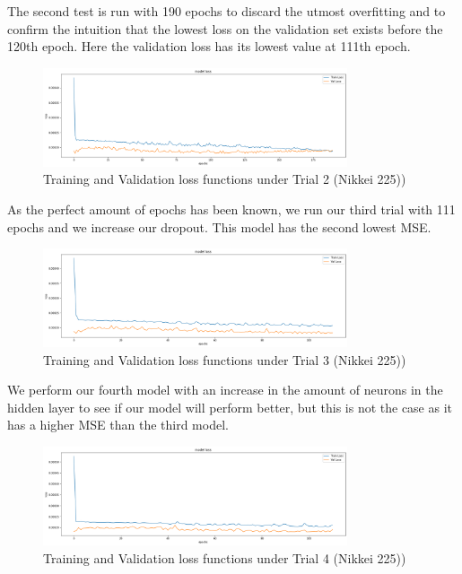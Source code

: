 \documentclass[a4paper,11pt,oneside]{book}
\begin{document}
 The second test is run with 190 epochs to discard the utmost overfitting and to confirm the intuition that the lowest loss on the validation set exists
 before the 120th epoch. Here the validation loss has its lowest value at 111th epoch. 
\begin{figure}[!h]
	\centering
	\includegraphics[width=0.8\textwidth]{figures/Nik2}
	\caption{Training and Validation loss functions under Trial 2 (Nikkei 225))}
	\label{Nik2}
\end{figure}

As the perfect amount of epochs has been known, we run our third trial with 111 epochs and we increase our dropout. This model has the second lowest MSE. 
\newpage
\begin{figure}[!h]
	\centering
	\includegraphics[width=0.8\textwidth]{figures/Nik3}
	\caption{Training and Validation loss functions under Trial 3 (Nikkei 225))}
	\label{Nik3}
\end{figure}
We perform our fourth model with an increase in the amount of neurons in the hidden layer to see if our model will perform better, but this is not the case as it has a higher MSE than the third model.
\newline
\begin{figure}[!h]
	\centering
	\includegraphics[width=0.8\textwidth]{figures/Nik4}
	\caption{Training and Validation loss functions under Trial 4 (Nikkei 225))}
	\label{Nik4}
\end{figure}
\end{document}
